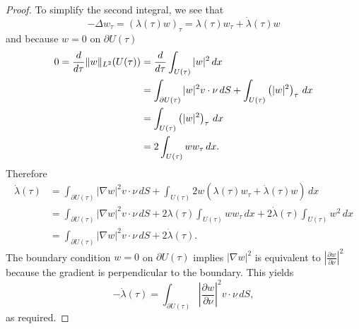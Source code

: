 \documentclass{article}
\DeclarePairedDelimiter{\norm}{\lVert}{\rVert}
\begin{document}
\begin{flushleft}
\begin{proof}
To simplify the second integral, we see that
$$-\Delta w_{\tau}=(\lambda(\tau) w)_{\tau}=\lambda(\tau) w_{\tau}+\dot{\lambda}(\tau)w$$
and because $w=0$ on $\partial U(\tau)$
\begin{align*}0=\frac{d}{d\tau}\norm{w}_{L^2}(U(\tau))&=\frac{d}{d\tau}\int_{U(\tau)}|w|^2\,dx \\&= \int_{\partial U(\tau)}|w|^2 v\cdot \nu\,dS + \int_{U(\tau)}\left(|w|^2\right)_{\tau}\,dx\\&=\int_{U(\tau)}\left(|w|^2\right)_{\tau}\,dx\\&=
2\int_{U(\tau)}ww_{\tau}\,dx.
\end{align*}
Therefore
\begin{align*}
\dot{\lambda}(\tau)&=\int_{\partial U(\tau)} |\nabla w|^2 v\cdot \nu\,dS + \int_{U(\tau)} 2w\left(\lambda(\tau) w_{\tau}+\dot{\lambda}(\tau)w\right)\,dx \\&=
\int_{\partial U(\tau)} |\nabla w|^2 v\cdot \nu\,dS + 2\lambda(\tau)\int_{U(\tau)}ww_{\tau}\,dx + 2\dot{\lambda}(\tau)\int_{U(\tau)}w^2\,dx\\&=
\int_{\partial U(\tau)} |\nabla w|^2 v\cdot \nu\,dS +2\dot{\lambda}(\tau).
\end{align*}
The boundary condition $w=0$ on $\partial U(\tau)$ implies $|\nabla w|^2$ is equivalent to $\left|\frac{\partial w}{\partial \nu}\right|^2$ because the gradient is perpendicular to the boundary. This yields
$$-\dot{\lambda}(\tau)=\int_{\partial U(\tau)} \left|\frac{\partial w}{\partial \nu}\right|^2 v\cdot \nu\,dS,$$
as required.
\end{proof}

\end{flushleft}
\end{document}
